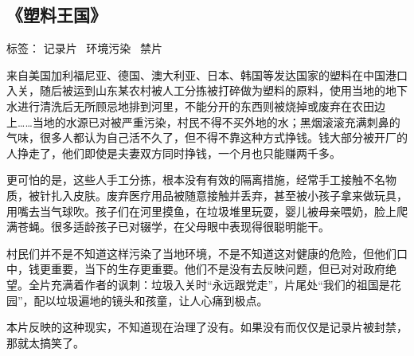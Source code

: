 \subsection{《塑料王国》}

标签： 记录片 \  环境污染  \  禁片

来自美国加利福尼亚、德国、澳大利亚、日本、韩国等发达国家的塑料在中国港口入关，随后被运到山东某农村被人工分拣被打碎做为塑料的原料，使用当地的地下水进行清洗后无所顾忌地排到河里，不能分开的东西则被烧掉或废弃在农田边上……当地的水源已对被严重污染，村民不得不买外地的水；黑烟滚滚充满刺鼻的气味，很多人都认为自己活不久了，但不得不靠这种方式挣钱。钱大部分被开厂的人挣走了，他们即使是夫妻双方同时挣钱，一个月也只能赚两千多。

更可怕的是，这些人手工分拣，根本没有有效的隔离措施，经常手工接触不名物质，被针扎入皮肤。废弃医疗用品被随意接触并丢弃，甚至被小孩子拿来做玩具，用嘴去当气球吹。孩子们在河里摸鱼，在垃圾堆里玩耍，婴儿被母亲喂奶，脸上爬满苍蝇。很多适龄孩子已对辍学，在父母眼中表现得很聪明能干。

村民们并不是不知道这样污染了当地环境，不是不知道这对健康的危险，但他们口中，钱更重要，当下的生存更重要。他们不是没有去反映问题，但已对对政府绝望。全片充满着作者的讽刺：垃圾入关时“永远跟党走”，片尾处“我们的祖国是花园”，配以垃圾遍地的镜头和孩童，让人心痛到极点。

本片反映的这种现实，不知道现在治理了没有。如果没有而仅仅是记录片被封禁，那就太搞笑了。

